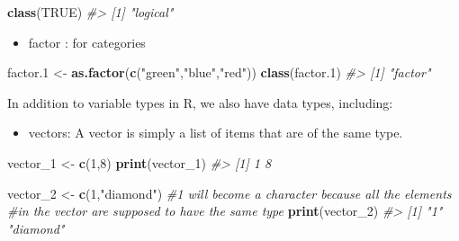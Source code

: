 \documentclass[
]{book}
\newenvironment{Shaded}{\begin{snugshade}}{\end{snugshade}}
\newcommand{\CommentTok}[1]{\textcolor[rgb]{0.56,0.35,0.01}{\textit{#1}}}
\newcommand{\ConstantTok}[1]{\textcolor[rgb]{0.56,0.35,0.01}{#1}}
\newcommand{\DecValTok}[1]{\textcolor[rgb]{0.00,0.00,0.81}{#1}}
\newcommand{\FloatTok}[1]{\textcolor[rgb]{0.00,0.00,0.81}{#1}}
\newcommand{\FunctionTok}[1]{\textcolor[rgb]{0.13,0.29,0.53}{\textbf{#1}}}
\newcommand{\NormalTok}[1]{#1}
\newcommand{\OtherTok}[1]{\textcolor[rgb]{0.56,0.35,0.01}{#1}}
\newcommand{\StringTok}[1]{\textcolor[rgb]{0.31,0.60,0.02}{#1}}
\providecommand{\tightlist}{%
  \setlength{\itemsep}{0pt}\setlength{\parskip}{0pt}}
\begin{document}
\begin{Shaded}
\begin{Highlighting}[]
\FunctionTok{class}\NormalTok{(}\ConstantTok{TRUE}\NormalTok{)}
\CommentTok{\#\textgreater{} [1] "logical"}
\end{Highlighting}
\end{Shaded}

\begin{itemize}
\tightlist
\item
  factor : for categories
\end{itemize}

\begin{Shaded}
\begin{Highlighting}[]
\NormalTok{factor}\FloatTok{.1} \OtherTok{\textless{}{-}} \FunctionTok{as.factor}\NormalTok{(}\FunctionTok{c}\NormalTok{(}\StringTok{"green"}\NormalTok{,}\StringTok{"blue"}\NormalTok{,}\StringTok{"red"}\NormalTok{))}
\FunctionTok{class}\NormalTok{(factor}\FloatTok{.1}\NormalTok{)}
\CommentTok{\#\textgreater{} [1] "factor"}
\end{Highlighting}
\end{Shaded}

In addition to variable types in R, we also have data types, including:

\begin{itemize}
\tightlist
\item
  vectors: A vector is simply a list of items that are of the same type.
\end{itemize}

\begin{Shaded}
\begin{Highlighting}[]
\NormalTok{vector\_1 }\OtherTok{\textless{}{-}} \FunctionTok{c}\NormalTok{(}\DecValTok{1}\NormalTok{,}\DecValTok{8}\NormalTok{)}
\FunctionTok{print}\NormalTok{(vector\_1)}
\CommentTok{\#\textgreater{} [1] 1 8}
\end{Highlighting}
\end{Shaded}

\begin{Shaded}
\begin{Highlighting}[]
\NormalTok{vector\_2 }\OtherTok{\textless{}{-}} \FunctionTok{c}\NormalTok{(}\DecValTok{1}\NormalTok{,}\StringTok{"diamond"}\NormalTok{) }\CommentTok{\#1 will become a character because all the elements }
                           \CommentTok{\#in the vector are supposed to have the same type}
\FunctionTok{print}\NormalTok{(vector\_2)}
\CommentTok{\#\textgreater{} [1] "1"       "diamond"}
\end{Highlighting}
\end{Shaded}
\end{document}
